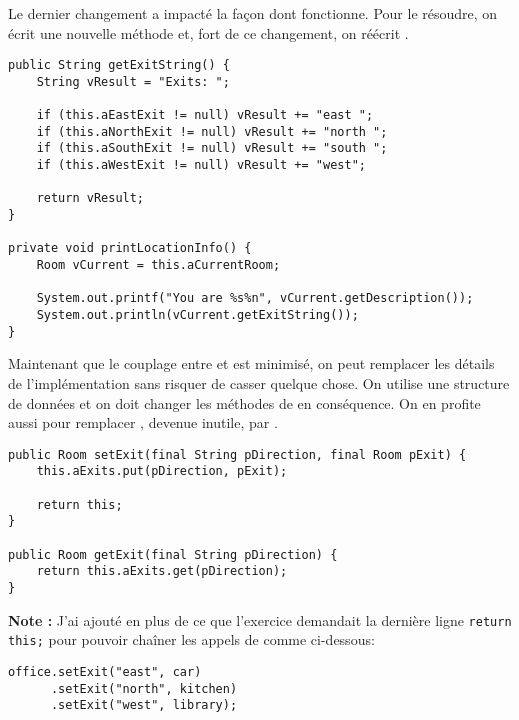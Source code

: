 \begin{exercise}[subtitle=getExitString]
Le dernier changement a impacté la façon dont  fonctionne. Pour le résoudre, on écrit une nouvelle méthode  et, fort de ce changement, on réécrit .

\begin{verbatim}
public String getExitString() {
    String vResult = "Exits: ";

    if (this.aEastExit != null) vResult += "east ";
    if (this.aNorthExit != null) vResult += "north ";
    if (this.aSouthExit != null) vResult += "south ";
    if (this.aWestExit != null) vResult += "west";

    return vResult;
}

private void printLocationInfo() {
    Room vCurrent = this.aCurrentRoom;

    System.out.printf("You are %s%n", vCurrent.getDescription());
    System.out.println(vCurrent.getExitString());
}
\end{verbatim}
\end{exercise}

\begin{exercise}[subtitle=HashMap et setExit]

Maintenant que le couplage entre  et  est minimisé, on peut remplacer les détails de l'implémentation sans risquer de casser quelque chose. On utilise une structure de données  et on doit changer les méthodes de  en conséquence. On en profite aussi pour remplacer , devenue inutile, par .

\begin{verbatim}
public Room setExit(final String pDirection, final Room pExit) {
    this.aExits.put(pDirection, pExit);

    return this;
}

public Room getExit(final String pDirection) {
    return this.aExits.get(pDirection);
}
\end{verbatim}
\end{exercise}

\textbf{Note :} J'ai ajouté en plus de ce que l'exercice demandait la dernière ligne \texttt{return this;} pour pouvoir chaîner les appels de  comme ci-dessous:

\begin{verbatim}
office.setExit("east", car)
      .setExit("north", kitchen)
      .setExit("west", library);
\end{verbatim}

